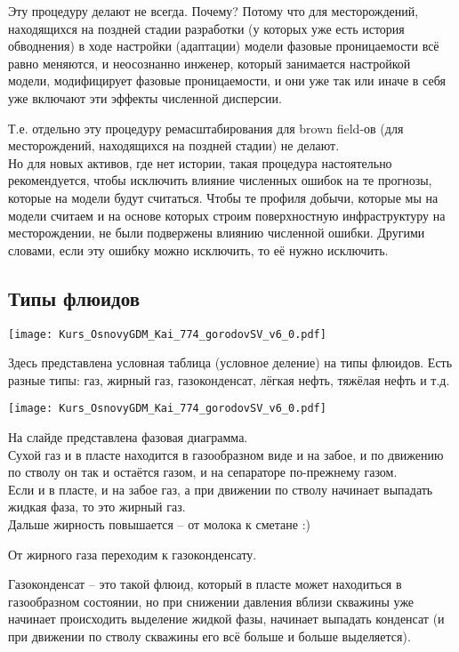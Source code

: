 \documentclass[main.tex]{subfiles}
\begin{document}
Эту процедуру делают не всегда.
Почему?
Потому что для месторождений, находящихся на поздней стадии разработки (у которых уже есть история обводнения) в ходе настройки (адаптации) модели фазовые проницаемости всё равно меняются, и неосознанно инженер, который занимается настройкой модели, модифицирует фазовые проницаемости, и они уже так или иначе в себя уже включают эти эффекты численной дисперсии.

Т.е. отдельно эту процедуру ремасштабирования для brown field-ов (для месторождений, находящихся на поздней стадии) не делают.
\\

Но для новых активов, где нет истории, такая процедура настоятельно рекомендуется, чтобы исключить влияние численных ошибок на те прогнозы, которые на модели будут считаться.
Чтобы те профиля добычи, которые мы на модели считаем и на основе которых строим поверхностную инфраструктуру на месторождении, не были подвержены влиянию численной ошибки.
Другими словами, если эту ошибку можно исключить, то её нужно исключить.

\subsection{Типы флюидов}

\texttt{[image: Kurs\_OsnovyGDM\_Kai\_774\_gorodovSV\_v6\_0.pdf]}

Здесь представлена условная таблица (условное деление) на типы флюидов.
Есть разные типы: газ, жирный газ, газоконденсат, лёгкая нефть, тяжёлая нефть и т.д.

\texttt{[image: Kurs\_OsnovyGDM\_Kai\_774\_gorodovSV\_v6\_0.pdf]}

На слайде представлена фазовая диаграмма.
\\

Сухой газ и в пласте находится в газообразном виде и на забое, и по движению по стволу он так и остаётся газом, и на сепараторе по-прежнему газом.
\\

Если и в пласте, и на забое газ, а при движении по стволу начинает выпадать жидкая фаза, то это жирный газ.
\\

Дальше жирность повышается -- от молока к сметане :)

От жирного газа переходим к газоконденсату.

Газоконденсат -- это такой флюид, который в пласте может находиться в газообразном состоянии, но при снижении давления вблизи скважины уже начинает происходить выделение жидкой фазы, начинает выпадать конденсат (и при движении по стволу скважины его всё больше и больше выделяется).
\\
\end{document}
